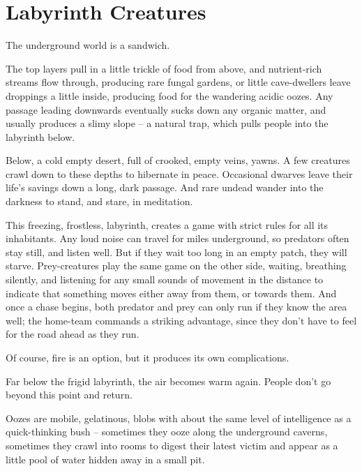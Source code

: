 \section[Labyrinth Creatures]{Labyrinth Creatures \A}

\begin{multicols}{2}

\noindent
The underground world is a sandwich.

The top layers pull in a little trickle of food from above, and nutrient-rich streams flow through, producing rare fungal gardens, or little cave-dwellers leave droppings a little inside, producing food for the wandering acidic oozes.
Any passage leading downwards eventually sucks down any organic matter, and usually produces a slimy slope -- a natural trap, which pulls people into the labyrinth below.

Below, a cold empty desert, full of crooked, empty veins, yawns.
A few creatures crawl down to these depths to hibernate in peace.
Occasional dwarves leave their life's savings down a long, dark passage.
And rare undead wander into the darkness to stand, and stare, in meditation.

This freezing, frostless, labyrinth, creates a game with strict rules for all its inhabitants.
Any loud noise can travel for miles underground, so predators often stay still, and listen well.
But if they wait too long in an empty patch, they will starve.
Prey-creatures play the same game on the other side, waiting, breathing silently, and listening for any small sounds of movement in the distance to indicate that something moves either away from them, or towards them.
And once a chase begins, both predator and prey can only run if they know the area well; the home-team commands a striking advantage, since they don't have to feel for the road ahead as they run.

Of course, fire is an option, but it produces its own complications.

Far below the frigid labyrinth, the air becomes warm again.
People don't go beyond this point and return.

\label{ooze}

Oozes are mobile, gelatinous, blobs with about the same level of intelligence as a quick-thinking bush -- sometimes they ooze along the underground caverns, sometimes they crawl into rooms to digest their latest victim and appear as a little pool of water hidden away in a small pit.


\end{multicols}
